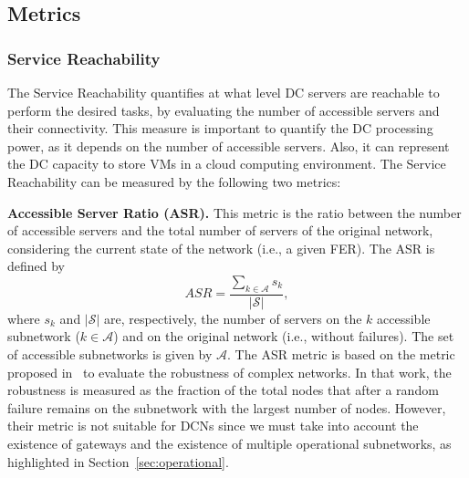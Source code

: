 \subsection{Metrics}
\label{sec:survivalTime} 
\subsubsection{Service Reachability}
The Service Reachability quantifies at what level DC servers are reachable to perform the desired tasks, by evaluating the number of accessible servers and their connectivity.
This measure is important to quantify the DC processing power, as it depends on the number of accessible servers.
Also, it can represent the DC capacity to store VMs in a cloud computing environment.
The Service Reachability can be measured by the following two metrics:

\textbf{Accessible Server Ratio (ASR).} This metric is the ratio between the number of accessible servers and the total number of servers of the original network, considering the current state of the network (i.e., a given FER). The ASR is defined by
\begin{equation}
ASR=\frac{\sum_{k \in \mathcal{A}}s_k}{|\mathcal{S}|},
\end{equation}
where $s_k$ and $|\mathcal{S}|$ are, respectively, the number of servers on the $k$ accessible subnetwork ($k \in \mathcal{A}$) and on the original network (i.e., without failures). The set of accessible subnetworks is given by $\mathcal{A}$. The ASR metric is based on the metric proposed in~\cite{albert2000error} to evaluate the robustness of complex networks. In that work, the robustness is measured as the fraction of the total nodes that after a random failure remains on the subnetwork with the largest number of nodes. However, their metric is not suitable for DCNs since we must take into account the existence of gateways and the existence of multiple operational subnetworks, as highlighted in Section~\ref{sec:operational}. 

